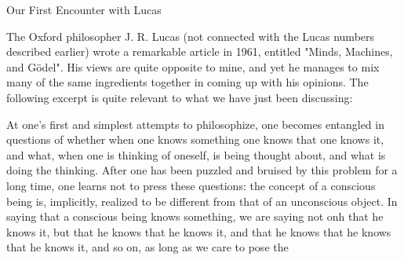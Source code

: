                               Our First Encounter with Lucas

The Oxford philosopher J. R. Lucas (not connected with the Lucas numbers described
earlier) wrote a remarkable article in 1961, entitled "Minds, Machines, and Gödel". His
views are quite opposite to mine, and yet he manages to mix many of the same
ingredients together in coming up with his opinions. The following excerpt is quite
relevant to what we have just been discussing:

   At one's first and simplest attempts to philosophize, one becomes entangled in questions of
   whether when one knows something one knows that one knows it, and what, when one is
   thinking of oneself, is being thought about, and what is doing the thinking. After one has
   been puzzled and bruised by this problem for a long time, one learns not to press these
   questions: the concept of a conscious being is, implicitly, realized to be different from that
   of an unconscious object. In saying that a conscious being knows something, we are saying
   not onh that he knows it, but that he knows that he knows it, and that he knows that he
   knows that he knows it, and so on, as long as we care to pose the





